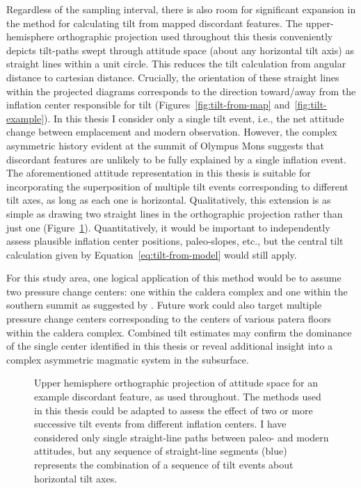 Regardless of the sampling interval, there is also room for significant expansion in the method for calculating tilt from mapped discordant features. The upper-hemisphere orthographic projection used throughout this thesis conveniently depicts tilt-paths swept through attitude space (about any horizontal tilt axis) as straight lines within a unit circle. This reduces the tilt calculation from angular distance to cartesian distance. Crucially, the orientation of these straight lines within the projected diagrams corresponds to the direction toward/away from the inflation center responsible for tilt (Figures~\ref{fig:tilt-from-map} and~\ref{fig:tilt-example}). In this thesis I consider only a single tilt event, i.e., the net attitude change between emplacement and modern observation. However, the complex asymmetric history evident at the summit of Olympus Mons suggests that discordant features are unlikely to be fully explained by a single inflation event. The aforementioned attitude representation in this thesis is suitable for incorporating the superposition of multiple tilt events corresponding to different tilt axes, as long as each one is horizontal. Qualitatively, this extension is as simple as drawing two straight lines in the orthographic projection rather than just one (Figure~\ref{fig:multiple-tilt}). Quantitatively, it would be important to independently assess plausible inflation center positions, paleo-slopes, etc., but the central tilt calculation given by Equation~\eqref{eq:tilt-from-model} would still apply.

For this study area, one logical application of this method would be to assume two pressure change centers: one within the caldera complex and one within the southern summit as suggested by \textcite{mouginis-mark_late-stage_2019}. Future work could also target multiple pressure change centers corresponding to the centers of various patera floors within the caldera complex. Combined tilt estimates may confirm the dominance of the single center identified in this thesis or reveal additional insight into a complex asymmetric magmatic system in the subsurface. 

\begin{figure}
    {\caption[Multiple tilt events]{Upper hemisphere orthographic projection of attitude space for an example discordant feature, as used throughout. The methods used in this thesis could be adapted to assess the effect of two or more successive tilt events from different inflation centers. I have considered only single straight-line paths between paleo- and modern attitudes, but any sequence of straight-line segments (blue) represents the combination of a sequence of tilt events about horizontal tilt axes. 
    }\label{fig:multiple-tilt}}
    {}
\end{figure}

